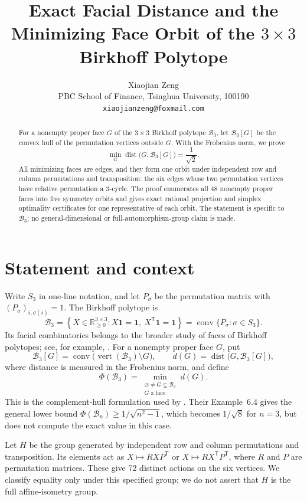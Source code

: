 \documentclass[11pt]{article}
\title{Exact Facial Distance and the Minimizing Face Orbit of the
$3\times3$ Birkhoff Polytope}
\author{Xiaojian Zeng\\
PBC School of Finance, Tsinghua University, 100190\\
\texttt{xiaojianzeng@foxmail.com}}
\date{}
\DeclareMathOperator{\dist}{dist}
\DeclareMathOperator{\conv}{conv}
\DeclareMathOperator{\vertices}{vert}
\begin{document}
\maketitle

\begin{abstract}
For a nonempty proper face $G$ of the $3\times3$ Birkhoff polytope
$\mathcal B_3$, let $\mathcal B_3[G]$ be the convex hull of the permutation
vertices outside $G$.  With the Frobenius norm, we prove
\[
 \min_G \dist\bigl(G,\mathcal B_3[G]\bigr)=\frac1{\sqrt2}.
\]
All minimizing faces are edges, and they form one orbit under independent
row and column permutations and transposition: the six edges whose two
permutation vertices have relative permutation a $3$-cycle.  The proof
enumerates all $48$ nonempty proper faces into five symmetry orbits and gives
exact rational projection and simplex optimality certificates for one
representative of each orbit.  The statement is specific to $\mathcal B_3$;
no general-dimensional or full-automorphism-group claim is made.
\end{abstract}

\section{Statement and context}

Write $S_3$ in one-line notation, and let $P_\sigma$ be the permutation
matrix with $(P_\sigma)_{i,\sigma(i)}=1$.  The Birkhoff polytope is
\[
 \mathcal B_3=\left\{X\in\mathbb R_{\geq0}^{3\times3}:
 X\mathbf1=\mathbf1,\ X^{\mathsf T}\mathbf1=\mathbf1\right\}
 =\conv\{P_\sigma:\sigma\in S_3\}.
\]
Its facial combinatorics belongs to the broader study of faces of Birkhoff
polytopes; see, for example, \citet{Paffenholz2015Faces}.  For a nonempty
proper face $G$, put
\[
 \mathcal B_3[G]=\conv\bigl(\vertices(\mathcal B_3)\setminus G\bigr),
 \qquad
 d(G)=\dist\bigl(G,\mathcal B_3[G]\bigr),
\]
where distance is measured in the Frobenius norm, and define
\[
 \Phi(\mathcal B_3)=\min_{\substack{\varnothing\ne G\subsetneq\mathcal B_3\\
 G\text{ a face}}}d(G).
\]
This is the complement-hull formulation used by \citet{PenaWirth2026}.
Their Example~6.4 gives the general lower bound
$\Phi(\mathcal B_n)\geq 1/\sqrt{n^2-1}$, which becomes $1/\sqrt8$ for
$n=3$, but does not compute the exact value in this case.

Let $H$ be the group generated by independent row and column permutations
and transposition.  Its elements act as
$X\mapsto RXP^{\mathsf T}$ or $X\mapsto RX^{\mathsf T}P^{\mathsf T}$,
where $R$ and $P$ are permutation matrices.  These give $72$ distinct
actions on the six vertices.  We classify equality only under this specified
group; we do not assert that $H$ is the full affine-isometry group.
\end{document}
